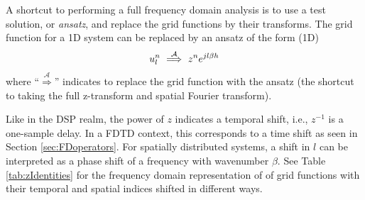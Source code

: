 A shortcut to performing a full frequency domain analysis is to use a test solution, or \textit{ansatz}, and replace the grid functions by their transforms. The grid function for a 1D system can be replaced by an ansatz of the form (1D) \cite{Strikwerda1989}
\begin{equation}\label{eq:ansatz}
    u_l^n \ \overset{\mathcal{A}}{\Longrightarrow}\  z^n e^{jl\beta h}
\end{equation} 
where ``$\overset{\mathcal{A}}{\Longrightarrow}$'' indicates to replace the grid function with the ansatz (the shortcut to taking the full z-transform and spatial Fourier transform). 

Like in the DSP realm, the power of $z$ indicates a temporal shift, i.e., $z^{-1}$ is a one-sample delay. In a FDTD context, this corresponds to a time shift as seen in Section \ref{sec:FDoperators}. For spatially distributed systems, a shift in $l$ can be interpreted as a phase shift of a frequency with wavenumber $\beta$. See Table \ref{tab:zIdentities} for the frequency domain representation of of grid functions with their temporal and spatial indices shifted in different ways. 


